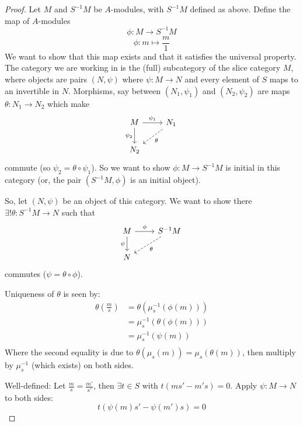 \documentclass[hidelinks,12pt]{article}
\begin{document}
\begin{proof}
    Let \(M\) and \(S^{-1}M\) be \(A\)-modules, with \(S^{-1}M\) defined as above. Define the map of \(A\)-modules
    \[
        \phi:M\to S^{-1}M
    \]
    \[
        \phi:m\mapsto \frac{m}{1}
    \]
    We want to show that this map exists and that it satisfies the universal property. The category we are working in is the (full) subcategory of the slice category \(M\), where objects are pairs \((N,\psi)\) where \(\psi:M\to N\) and every element of \(S\) maps to an invertible in \(N\). Morphisms, say between \((N_{1},\psi_{1})\) and \((N_{2},\psi_{2})\) are maps \(\theta:N_{1}\to N_{2}\) which make \[
        \begin{tikzcd}
            M \arrow[r, "\psi_{1}"] \arrow[d, "\psi_{2}"'] & N_{1} \arrow[dl, "\theta",dashed] \\
            N_{2}  &
        \end{tikzcd}
    \]
    commute (so \(\psi_{2}=\theta\circ\psi_{1}\)). So we want to show \(\phi:M\to S^{-1}M\) is initial in this category (or, the pair \((S^{-1}M,\phi)\) is an initial object).
    \par So, let \((N,\psi)\) be an object of this category. We want to show there \(\exists! \theta:S^{-1}M\to N\) such that 
    \[
        \begin{tikzcd}
            M \arrow[r, "\phi"] \arrow[d, "\psi"'] & S^{-1}M \arrow[dl, "\theta",dashed] \\
            N  &
        \end{tikzcd}
    \]
    commutes (\(\psi=\theta\circ\phi\)).
    \par Uniqueness of \(\theta\) is seen by:
    \begin{align*}
        \theta\left(\frac{m}{s}\right)&=\theta\left(\mu_{s}^{-1}\left(\phi(m)\right)\right)\\
                                      &=\mu_{s}^{-1}\left(\theta\left(\phi(m)\right)\right)\\
                                      &=\mu_{s}^{-1}\left(\psi(m)\right)\\
    \end{align*}
    Where the second equality is due to \(\theta\left(\mu_{s}(m)\right)=\mu_{s}\left(\theta(m)\right)\), then multiply by \(\mu_{s}^{-1}\) (which exists) on both sides.
    \par Well-defined: Let \(\frac{m}{s}=\frac{m'}{s'}\), then \(\exists t\in S\) with \(t(ms'-m's)=0\). Apply \(\psi:M\to N\) to both sides:
    \[
        t(\psi(m)s'-\psi(m')s)=0
\]
\end{proof}
\end{document}
